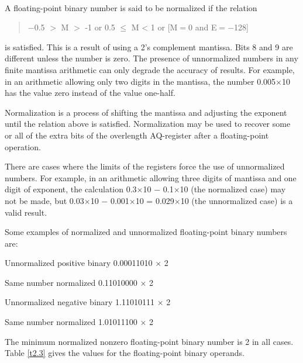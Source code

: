 \paragraph{}


A floating-point binary number is said to be normalized if the relation
\begin{quotation}
\hspace{2em}$-$0.5 $>$ M $>$ -1 or 0.5 $\leq$ M < 1 or [M$=$0 and E$=$$-$128]
\end{quotation}
is satisfied. This is a result of using a 2's complement mantissa. Bits 8 and 9
are different unless the number is zero. The presence of unnormalized numbers
in any finite mantissa arithmetic can only degrade the accuracy of results. For
example, in an arithmetic allowing only two digits in the mantissa, the number
0.005$\times$10 has the value zero instead of the value one-half.  

Normalization is a process of shifting the mantissa and adjusting the exponent
until the relation above is satisfied. Normalization may be used to recover
some or all of the extra bits of the overlength AQ-register after a
floating-point operation.  

There are cases where the limits of the registers force the use of unnormalized
numbers.  For example, in an arithmetic allowing three digits of mantissa and
one digit of exponent, the calculation 0.3$\times$10 $-$ 0.1$\times$10 (the
normalized case) may not be made, but 0.03$\times$10 $-$ 0.001$\times$10 =
0.029$\times$10 (the unnormalized case) is a valid result.  

Some examples of normalized and unnormalized floating-point binary numbers are:


\begin{description}
\item Unnormalized positive binary 0.00011010 $\times$ 2
\item Same number normalized 0.11010000 $\times$ 2
\item Unnormalized negative binary 1.11010111 $\times$ 2
\item Same number normalized 1.01011100 $\times$ 2
\end{description}

The minimum normalized nonzero floating-point binary number is 2 in
all cases. Table \ref{t2.3} gives the values for the floating-point binary
operands.  



